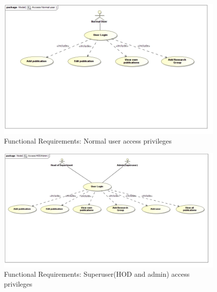 \documentclass[a4paper]{article}
\begin{document}
	\begin{figure}[H]
		\includegraphics[width=\textwidth]{AccessNormaluser.jpg}
		\caption{Functional Requirements: Normal user access privileges \label{overflow}}
	\end{figure}
	\begin{figure}[H]
		\includegraphics[width=\textwidth]{AccessHODAdmin.jpg}
		\caption{Functional Requirements: Superuser(HOD and admin) access privileges \label{overflow}}
	\end{figure}
\end{document}
